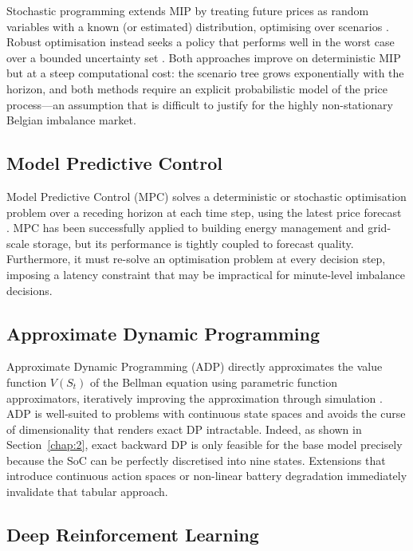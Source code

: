 Stochastic programming extends MIP by treating future prices as random variables with a known (or estimated) distribution, optimising over scenarios \cite{[search: stochastic programming electricity storage price uncertainty scenarios]}. Robust optimisation instead seeks a policy that performs well in the worst case over a bounded uncertainty set \cite{[search: robust optimisation battery storage imbalance market energy]}. Both approaches improve on deterministic MIP but at a steep computational cost: the scenario tree grows exponentially with the horizon, and both methods require an explicit probabilistic model of the price process—an assumption that is difficult to justify for the highly non-stationary Belgian imbalance market.

\subsection{Model Predictive Control}

Model Predictive Control (MPC) solves a deterministic or stochastic optimisation problem over a receding horizon at each time step, using the latest price forecast \cite{[search: model predictive control battery energy storage real-time dispatch]}. MPC has been successfully applied to building energy management and grid-scale storage, but its performance is tightly coupled to forecast quality. Furthermore, it must re-solve an optimisation problem at every decision step, imposing a latency constraint that may be impractical for minute-level imbalance decisions.

\subsection{Approximate Dynamic Programming}

Approximate Dynamic Programming (ADP) directly approximates the value function $V(S_t)$ of the Bellman equation using parametric function approximators, iteratively improving the approximation through simulation \cite{powell2022reinforcement}. ADP is well-suited to problems with continuous state spaces and avoids the curse of dimensionality that renders exact DP intractable. Indeed, as shown in Section~\ref{chap:2}, exact backward DP is only feasible for the base model precisely because the SoC can be perfectly discretised into nine states. Extensions that introduce continuous action spaces or non-linear battery degradation immediately invalidate that tabular approach.

\subsection{Deep Reinforcement Learning}
\label{sec:why-drl}

